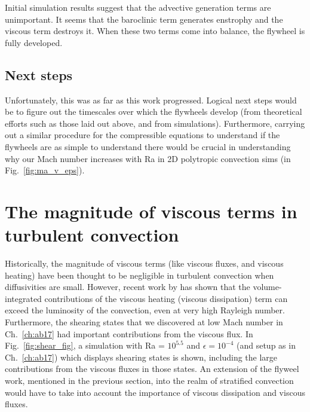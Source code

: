 Initial simulation results suggest that the advective generation terms are unimportant.
It seems that the baroclinic term generates enstrophy and the viscous term destroys it.
When these two terms come into balance, the flywheel is fully developed.

\subsection{Next steps}
Unfortunately, this was as far as this work progressed.
Logical next steps would be to figure out the timescales over which the flywheels develop (from theoretical efforts such as those laid out above, and from simulations).
Furthermore, carrying out a similar procedure for the compressible equations to understand if the flywheels are as simple to understand there would be crucial in understanding why our Mach number increases with Ra in 2D polytropic convection sims (in Fig.~\ref{fig:ma_v_eps}).

\section{The magnitude of viscous terms in turbulent convection}
Historically, the magnitude of viscous terms (like viscous fluxes, and viscous heating) have been thought to be negligible in turbulent convection when diffusivities are small.
However, recent work by \citet{currie&all2017} has shown that the volume-integrated contributions of the viscous heating (viscous dissipation) term can exceed the luminosity of the convection, even at very high Rayleigh number.
Furthermore, the shearing states that we discovered at low Mach number in Ch.~\ref{ch:ab17} had important contributions from the viscous flux.
In Fig.~\ref{fig:shear_fig}, a simulation with Ra = $10^{5.5}$ and $\epsilon = 10^{-4}$ (and setup as in Ch.~\ref{ch:ab17}) which displays shearing states is shown, including the large contributions from the viscous fluxes in those states.
An extension of the flyweel work, mentioned in the previous section, into the realm of stratified convection would have to take into account the importance of viscous dissipation and viscous fluxes.

